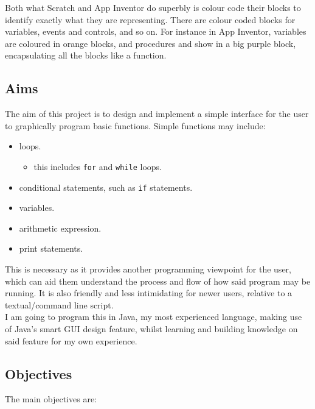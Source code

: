 \documentclass[a4paper, 12pt]{article}
\begin{document}
    Both what Scratch and App Inventor do superbly is colour code their blocks to identify 
    exactly what they are representing. There are colour coded blocks for variables, events 
    and controls, and so on. For instance in App Inventor, variables are coloured in orange 
    blocks, and procedures and show in a big purple block, encapsulating all the blocks like 
    a function.

        \subsection{Aims}
            The aim of this project is to design and implement a simple interface for the
            user to graphically program basic functions. Simple functions may include:

            \begin{itemize}
                \item loops.
                \begin{itemize}
                    \item this includes \texttt{for} and \texttt{while} loops.
                \end{itemize}
                \item conditional statements, such as \texttt{if} statements.
                \item variables.
                \item arithmetic expression.
                \item print statements.
            \end{itemize}
            
            This is necessary as it provides another programming viewpoint for the user,
            which can aid them understand the process and flow of how said program may
            be running. It is also friendly and less intimidating for newer users,
            relative to a textual/command line script. \\
            
            I am going to program this in Java, my most experienced language, making use
            of Java's smart GUI design feature, whilst learning and building knowledge on
            said feature for my own experience.

        \subsection{Objectives}
            The main objectives are:
\end{document}
